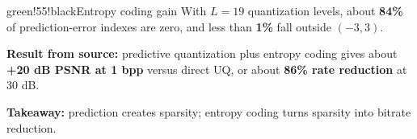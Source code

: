 \begin{calloutbox}{green!55!black}{Entropy coding gain}
With $L=19$ quantization levels, about \textbf{84\%} of prediction-error indexes are zero, and less than \textbf{1\%} fall outside $(-3,3)$.

\textbf{Result from source:} predictive quantization plus entropy coding gives about \textbf{+20 dB PSNR at 1 bpp} versus direct UQ, or about \textbf{86\% rate reduction} at 30 dB.

\textbf{Takeaway:} prediction creates sparsity; entropy coding turns sparsity into bitrate reduction.
\end{calloutbox}
